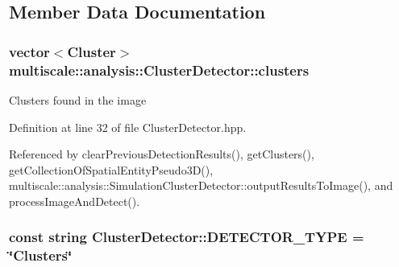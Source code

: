 \subsection{\-Member \-Data \-Documentation}
\hypertarget{classmultiscale_1_1analysis_1_1ClusterDetector_aa81a8649bc743389c2fc1919d47eb5b3}{
\subsubsection[{clusters}]{\setlength{\rightskip}{0pt plus 5cm}vector$<${\bf \-Cluster}$>$ {\bf multiscale\-::analysis\-::\-Cluster\-Detector\-::clusters}}}\label{classmultiscale_1_1analysis_1_1ClusterDetector_aa81a8649bc743389c2fc1919d47eb5b3}
\-Clusters found in the image 

\-Definition at line 32 of file \-Cluster\-Detector.\-hpp.



\-Referenced by clear\-Previous\-Detection\-Results(), get\-Clusters(), get\-Collection\-Of\-Spatial\-Entity\-Pseudo3\-D(), multiscale\-::analysis\-::\-Simulation\-Cluster\-Detector\-::output\-Results\-To\-Image(), and process\-Image\-And\-Detect().

\hypertarget{classmultiscale_1_1analysis_1_1ClusterDetector_ae2eae436968e6f637208af7d5a9d93b1}{
\subsubsection[{\-D\-E\-T\-E\-C\-T\-O\-R\-\_\-\-T\-Y\-P\-E}]{\setlength{\rightskip}{0pt plus 5cm}const string {\bf \-Cluster\-Detector\-::\-D\-E\-T\-E\-C\-T\-O\-R\-\_\-\-T\-Y\-P\-E} = \char`\"{}\-Clusters\char`\"{}}}\label{classmultiscale_1_1analysis_1_1ClusterDetector_ae2eae436968e6f637208af7d5a9d93b1}


